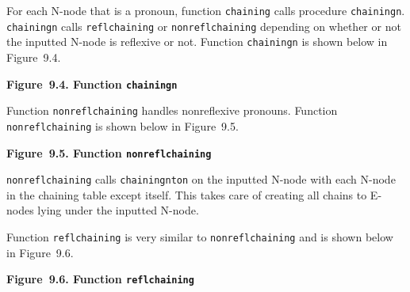 \documentclass{article}
\begin{document}
For each N-node that is a pronoun, function \texttt{chaining}
calls procedure \texttt{chainingn}. \texttt{chainingn} calls
\texttt{reflchaining} or \texttt{nonreflchaining} depending on
whether or not the inputted N-node is reflexive or
not. Function \texttt{chainingn} is shown below in Figure~9.4.

\bigbreak
\begin{minipage}{\textwidth}
\vbox{}
\bigbreak
{}
\textbf{Figure~9.4. Function \texttt{chainingn}}
\end{minipage}
\bigbreak

Function \texttt{nonreflchaining} handles nonreflexive
pronouns. Function \texttt{nonreflchaining} is shown below in
Figure~9.5.

\bigbreak
\begin{minipage}{\textwidth}
\vbox{}
\bigbreak
{}
\textbf{Figure~9.5. Function \texttt{nonreflchaining}}
\end{minipage}
\bigbreak

\texttt{nonreflchaining} calls \texttt{chainingnton} on the
inputted N-node with each N-node in the chaining table except
itself.  This takes care of creating all chains to E-nodes lying
under the inputted N-node.

Function \texttt{reflchaining} is very similar to
\texttt{nonreflchaining} and is shown below in Figure~9.6.

\bigbreak
\begin{minipage}{\textwidth}
\vbox{}
\bigbreak
{}
\textbf{Figure~9.6. Function \texttt{reflchaining}}
\end{minipage}
\bigbreak
\end{document}
